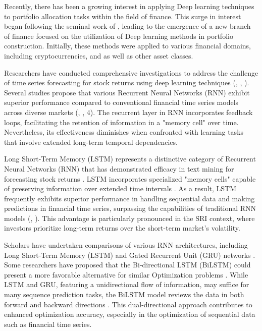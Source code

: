 Recently, there has been a growing interest in applying Deep learning techniques to portfolio allocation tasks within the field of finance. This surge in interest began following the seminal work of \citep{Zhang2019400}, leading to the emergence of a new branch of finance focused on the utilization of Deep learning methods in portfolio construction. Initially, these methods were applied to various financial domains, including cryptocurrencies, and as well as other asset classes.

Researchers have conducted comprehensive investigations to address the challenge of time series forecasting for stock returns using deep learning techniques (\citep{Chiang2016}, \citep{DiPersio2016}, \citep{Moghaddam2016}). Several studies propose that various Recurrent Neural Networks (RNN) exhibit superior performance compared to conventional financial time series models across diverse markets (\cite{Bao2017}, \cite{Chen2015}, 4\cite{Sermpinis2019}). The recurrent layer in RNN incorporates feedback loops, facilitating the retention of information in a "memory cell" over time. Nevertheless, its effectiveness diminishes when confronted with learning tasks that involve extended long-term temporal dependencies.

Long Short-Term Memory (LSTM) represents a distinctive category of Recurrent Neural Networks (RNN) that has demonstrated efficacy in text mining for forecasting stock returns \cite{Kraus2017}. LSTM incorporates specialized "memory cells" capable of preserving information over extended time intervals \cite{Hochreiter19971735}. As a result, LSTM frequently exhibits superior performance in handling sequential data and making predictions in financial time series, surpassing the capabilities of traditional RNN models (\cite{Jiang2019}, \cite{Nelson2017}). This advantage is particularly pronounced in the SRI context, where investors prioritize long-term returns over the short-term market's volatility.

Scholars have undertaken comparisons of various RNN architectures, including Long Short-Term Memory (LSTM) and Gated Recurrent Unit (GRU) networks \cite{Samarawickrama2017}. Some researchers have proposed that the Bi-directional LSTM (BiLSTM) could present a more favorable alternative for similar Optimization problems \cite{Chen2017}. While LSTM and GRU, featuring a unidirectional flow of information, may suffice for many sequence prediction tasks, the BiLSTM model reviews the data in both forward and backward directions \cite{Schuster1997}. This dual-directional approach contributes to enhanced optimization accuracy, especially in the optimization of sequential data such as financial time series.

